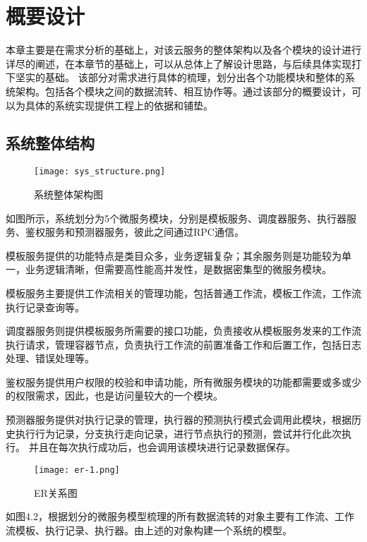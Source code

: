 
\chapter{概要设计}
本章主要是在需求分析的基础上，对该云服务的整体架构以及各个模块的设计进行详尽的阐述，在本章节的基础上，可以从总体上了解设计思路，与后续具体实现打下坚实的基础。
该部分对需求进行具体的梳理，划分出各个功能模块和整体的系统架构。包括各个模块之间的数据流转、相互协作等。通过该部分的概要设计，可以为具体的系统实现提供工程上的依据和铺垫。


\section{系统整体结构}

\begin{figure}[H]
    \centering
    \texttt{[image: sys\_structure.png]}
    \caption{系统整体架构图}
    \label{fig:系统整体架构图}
    \note{}
\end{figure}



如图所示，系统划分为5个微服务模块，分别是模板服务、调度器服务、执行器服务、鉴权服务和预测器服务，彼此之间通过RPC通信。

模板服务提供的功能特点是类目众多，业务逻辑复杂；其余服务则是功能较为单一，业务逻辑清晰，但需要高性能高并发性，是数据密集型的微服务模块。

模板服务主要提供工作流相关的管理功能，包括普通工作流，模板工作流，工作流执行记录查询等。

调度器服务则提供模板服务所需要的接口功能，负责接收从模板服务发来的工作流执行请求，管理容器节点，负责执行工作流的前置准备工作和后置工作，包括日志处理、错误处理等。

鉴权服务提供用户权限的校验和申请功能，所有微服务模块的功能都需要或多或少的权限需求，因此，也是访问量较大的一个模块。

预测器服务提供对执行记录的管理，执行器的预测执行模式会调用此模块，根据历史执行行为记录，分支执行走向记录，进行节点执行的预测，尝试并行化此次执行。
并且在每次执行成功后，也会调用该模块进行记录数据保存。


\begin{figure}[H]
    \centering
    \texttt{[image: er-1.png]}
    \caption{ER关系图}
    \label{fig:ER关系图}
    \note{}
\end{figure}

如图4.2，根据划分的微服务模型梳理的所有数据流转的对象主要有工作流、工作流模板、执行记录、执行器。由上述的对象构建一个系统的模型。

